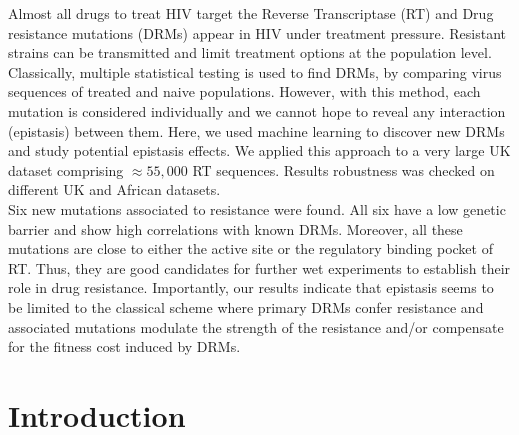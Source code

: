 \documentclass[
  11pt,
  twoside]{scrbook}
\begin{document}
Almost all drugs to treat HIV target the Reverse Transcriptase (RT) and
Drug resistance mutations (DRMs) appear in HIV under treatment pressure.
Resistant strains can be transmitted and limit treatment options at the
population level. Classically, multiple statistical testing is used to
find DRMs, by comparing virus sequences of treated and naive
populations. However, with this method, each mutation is considered
individually and we cannot hope to reveal any interaction (epistasis)
between them. Here, we used machine learning to discover new DRMs and
study potential epistasis effects. We applied this approach to a very
large UK dataset comprising \(\approx 55,000\) RT sequences. Results
robustness was checked on different UK and African datasets.\\
Six new mutations associated to resistance were found. All six have a
low genetic barrier and show high correlations with known DRMs.
Moreover, all these mutations are close to either the active site or the
regulatory binding pocket of RT. Thus, they are good candidates for
further wet experiments to establish their role in drug resistance.
Importantly, our results indicate that epistasis seems to be limited to
the classical scheme where primary DRMs confer resistance and associated
mutations modulate the strength of the resistance and/or compensate for
the fitness cost induced by DRMs.

\hypertarget{hiv-introduction}{%
\section{Introduction}\label{hiv-introduction}}
\end{document}
